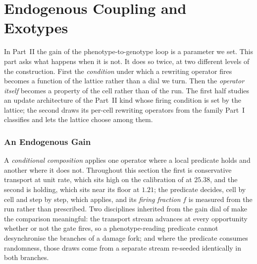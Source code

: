 %
%

\part{Endogenous Coupling and Exotypes}
\label{part:endogenous}

\noindent In Part~II the gain of the phenotype-to-genotype loop is a parameter we
set. This part asks what happens when it is not. It does so twice, at two
different levels of the construction. First the \emph{condition} under which a
rewriting operator fires becomes a function of the lattice rather than a dial we
turn. Then the \emph{operator itself} becomes a property of the cell rather than
of the run. The first half studies an update architecture of the Part~II kind whose firing
condition is set by the lattice; the second draws its per-cell rewriting operators from the
family Part~I classifies and lets the lattice choose among them.

\section{An Endogenous Gain}
\label{sec:endogenous-gain}

A \emph{conditional composition} applies one operator where a local predicate
holds and another where it does not. Throughout this section the first is
conservative transport at unit rate, which sits high on the
calibration of  at $25.38$, and the second is holding, which
sits near its floor at $1.21$; the predicate decides, cell by cell and step
by step, which applies, and its \emph{firing fraction} $f$ is measured from the
run rather than prescribed. Two disciplines inherited from the gain dial of
 make the comparison meaningful: the transport stream advances
at every opportunity whether or not the gate fires, so a phenotype-reading
predicate cannot desynchronise the branches of a damage fork; and where the
predicate consumes randomness, those draws come from a separate stream re-seeded
identically in both branches.

